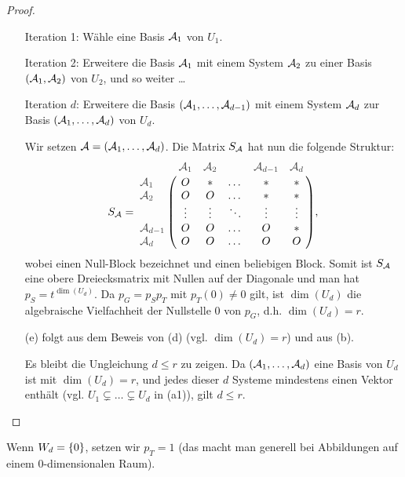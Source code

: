 \begin{proof}
\begin{itemize}
		Iteration 1: Wähle eine Basis $ \mathcal{A}_1 $ von $ U_1 $.
		
		Iteration 2: Erweitere die Basis $ \mathcal{A}_1 $ mit einem System $ \mathcal{A}_2 $ zu einer Basis $ (\mathcal{A}_1,\mathcal{A}_2) $ von $ U_2 $, und so weiter \ldots
		
		Iteration $ d $: Erweitere die Basis $ (\mathcal{A}_1, \ldots, \mathcal{A}_{d-1}) $ mit einem System $ \mathcal{A}_d $ zur Basis $ (\mathcal{A}_1, \ldots, \mathcal{A}_d) $ von $ U_d $.
		
		Wir setzen $ \mathcal{A} = (\mathcal{A}_1, \ldots, \mathcal{A}_d) $. Die Matrix $ S_{\mathcal{A}} $ hat nun die folgende Struktur:
		\begin{equation*}
			S_\A = \bordermatrix{
				& \bordernote{\A_1} & \bordernote{\A_2} & & \bordernote{\A_{d-1}} & \bordernote{\A_{d}} \cr
				\bordernote{\A_1} & O & * & \dots & * & * \cr
				\bordernote{\A_2} & O & O & \dots & * & * \cr
				& \vdots & \vdots &\ddots& \vdots & \vdots \cr
				\bordernote{\A_{d-1}} & O & O & \dots & O & * \cr
				\bordernote{\A_d} & O & O & \dots & O & O \cr
			},
		\end{equation*}
		wobei  einen Null-Block bezeichnet und \fbox{$ \ast\vphantom{O} $} einen beliebigen Block. Somit ist $ S_{\mathcal{A}} $ eine obere Dreiecksmatrix mit Nullen auf der Diagonale und man hat $ p_S = t^{\dim(U_d)} $. Da $ p_G = p_Sp_T $ mit $ p_T(0) \neq 0 $ gilt, ist $ \dim(U_d) $ die algebraische Vielfachheit der Nullstelle 0 von $ p_G $, d.h. $ \dim(U_d) = r $.
		\item[(e)]
		folgt aus dem Beweis von (d) (vgl. $ \dim(U_d) = r $) und aus (b).
		
		Es bleibt die Ungleichung $ d \leq r $ zu zeigen. Da $ (\mathcal{A}_1, \ldots, \mathcal{A}_d) $ eine Basis von $ U_d $ ist mit $ \dim(U_d) = r $, und jedes dieser $ d $ Systeme mindestens einen Vektor enthält (vgl. $ U_1 \varsubsetneq \ldots \varsubsetneq U_d $ in (a1)), gilt $ d \leq r $. \qedhere
	\end{itemize}
\end{proof}
\begin{bem}
	Wenn $ W_d = \left\{ 0 \right\} $, setzen wir $ p_T = 1 $ (das macht man generell bei Abbildungen auf einem 0-dimensionalen Raum).
\end{bem}
